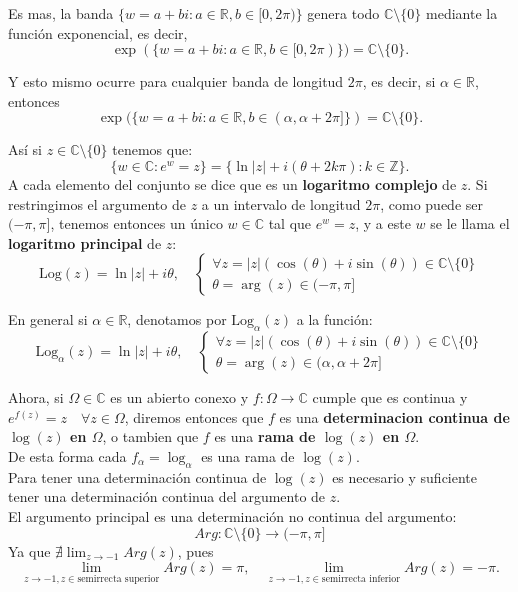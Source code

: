 Es mas, la banda $\{ w = a + bi : a \in \mathbb{R}, b \in [0, 2\pi) \}$ genera todo $\mathbb{C} \setminus \{0\}$ mediante la función exponencial, es decir,
\[
    \exp(\{ w = a + bi : a \in \mathbb{R}, b \in [0, 2\pi) \}) = \mathbb{C} \setminus \{0\}.
\]

Y esto mismo ocurre para cualquier banda de longitud $2\pi$, es decir, si $\alpha \in \mathbb{R}$, entonces
\[
    \exp(\{ w = a + bi : a \in \mathbb{R}, b \in (\alpha, \alpha + 2\pi] \}) = \mathbb{C} \setminus \{0\}.
\]

\begin{definición}
    Así si $z \in \mathbb{C} \setminus \{0\}$ tenemos que:
\[
    \{ w \in \mathbb{C} : e^w = z \} = 
    \{\ln|z| + i(\theta + 2k\pi) : k \in \mathbb{Z}\}.
\]
A cada elemento del conjunto se dice que es un \textbf{logaritmo complejo} de $z$.
Si restringimos el argumento de $z$ a un intervalo de longitud $2\pi$, como puede ser $(-\pi, \pi]$, tenemos entonces un único $w \in \mathbb{C}$ tal que $e^w = z$, y a este $w$ se le llama el \textbf{logaritmo principal} de $z$:
\[
    \text{Log}(z) = \ln|z| + i\theta, \quad 
    \begin{cases}
        \forall z = |z|(\cos(\theta) + i\sin(\theta)) \in \mathbb{C} \setminus \{0\} \\
        \theta = \arg(z) \in (-\pi, \pi]
    \end{cases}
\]
\end{definición}

En general si $\alpha \in \mathbb{R}$, denotamos por $\text{Log}_\alpha(z)$ a la función:
\[
    \text{Log}_\alpha(z) = \ln|z| + i\theta, \quad 
    \begin{cases}
        \forall z = |z|(\cos(\theta) + i\sin(\theta)) \in \mathbb{C} \setminus \{0\} \\
        \theta = \arg(z) \in (\alpha, \alpha + 2\pi]
    \end{cases}
\]

Ahora, si $\Omega \in \mathbb{C}$ es un abierto conexo y $f : \Omega \to \mathbb{C}$ cumple que es continua y $e^{f(z)} = z \quad \forall z \in \Omega$, diremos entonces que $f$ es una \textbf{determinacion continua de $\log(z)$ en $\Omega$}, o tambien que $f$ es una \textbf{rama de $\log(z)$ en $\Omega$}.\\
De esta forma cada $f_\alpha = \log_\alpha$ es una rama de $\log(z)$.\\

Para tener una determinación continua de $\log(z)$ es necesario y suficiente tener una determinación continua del argumento de $z$.\\
El argumento principal es una determinación no continua del argumento:
\[
    Arg : \mathbb{C} \setminus \{0\} \to (-\pi, \pi]
\]
Ya que $\nexists \lim_{z \to -1} Arg(z)$, pues
\[    \lim_{z \to -1, z \in \text{semirrecta superior}} Arg(z) = \pi, \quad \lim_{z \to -1, z \in \text{semirrecta inferior}} Arg(z) = -\pi.
\]

